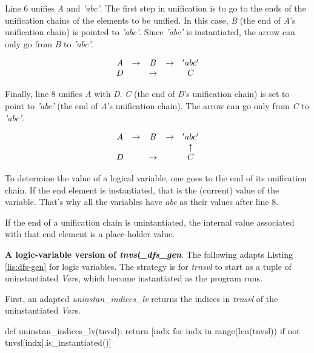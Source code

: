 Line 6 unifies \textit{A} and \textit{'abc'}. The first step in unification is to go to the ends of the unification chains of the elements to be unified. In this case, \textit{B} (the end of \textit{A}'s unification chain) is pointed to \textit{'abc'}. Since  \textit{'abc'} is instantiated, the arrow can only go from \textit{B} to \textit{'abc'}. 

\begin{equation}\label{eq:three}
\begin{array}{c c c c c c c c c c c}
A & \to & B            & \to & 'abc'    \\ 
D &     &       \to    &     & C        
\end{array}
\end{equation}

Finally, line 8  unifies \textit{A} with \textit{D}. \textit{C} (the end of \textit{D}'s unification chain) is set to point to \textit{'abc'} (the end of \textit{A}'s unification chain). The arrow can go only from \textit{C} to \textit{'abc'}.

\begin{equation}\label{eq:three}
\begin{array}{c c c c c c c c c c c}
A & \to & B            & \to & 'abc'      \\ 
  &     &              &     & \uparrow   \\ 
D &     &       \to    &     & C        
\end{array}
\end{equation}


To determine the value of a logical variable, one goes to the end of its unification chain. If the end element is instantiated, that is the (current) value of the variable. That's why all the variables have \textit{abc} as their values after line 8. 

If the end of a unification chain is unintantiated, the internal value associated with that end element is a place-holder value.

\smallv
\noindent \textbf{A logic-variable version of \textit{tnvsl\_dfs\_gen}}. The following adapts Listing \ref{lis:dfs-gen} for logic variables. The strategy is for \textit{trnsvl} to start as a tuple of uninstantiated \textit{Var}s, which become instantiated as the program runs.

First, an adapted \textit{uninstan\_indices\_lv} returns the indices in \textit{trnsvl} of the uninstantiated \textit{Var}s.

\begin{minipage}[c]{0.45\textwidth}
\begin{python1}
def uninstan_indices_lv(tnvsl):
  return [indx for indx in range(len(tnvsl)) 
               if not tnvsl[indx].is_instantiated()]
\end{python1}
\end{minipage}

